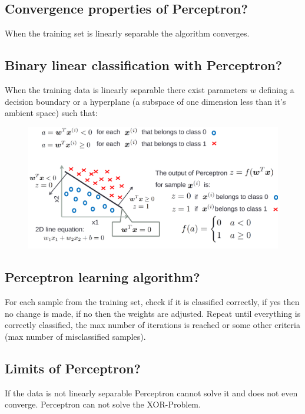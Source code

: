 \documentclass[12pt]{scrartcl}
\begin{document}
\subsection{Convergence properties of Perceptron?}
When the training set is linearly separable the algorithm converges.

\subsection{Binary linear classification with Perceptron?}
When the training data is linearly separable there exist parameters $w$ defining a decision boundary or a hyperplane (a subspace of one dimension less than it's ambient space) such that:
\begin{figure}[htb]
  \begin{center}
  \includegraphics[scale=0.35]{perceptron}
  \end{center}
  \vspace{-\baselineskip}
\end{figure}

\subsection{Perceptron learning algorithm?}
For each sample from the training set, check if it is classified correctly, if yes then no change is made, if no then the weights are adjusted. Repeat until everything is correctly classified, the max number of iterations is reached or some other criteria (max number of misclassified samples).

\subsection{Limits of Perceptron?}
If the data is not linearly separable Perceptron cannot solve it and does not even converge. Perceptron can not solve the XOR-Problem.
\end{document}
